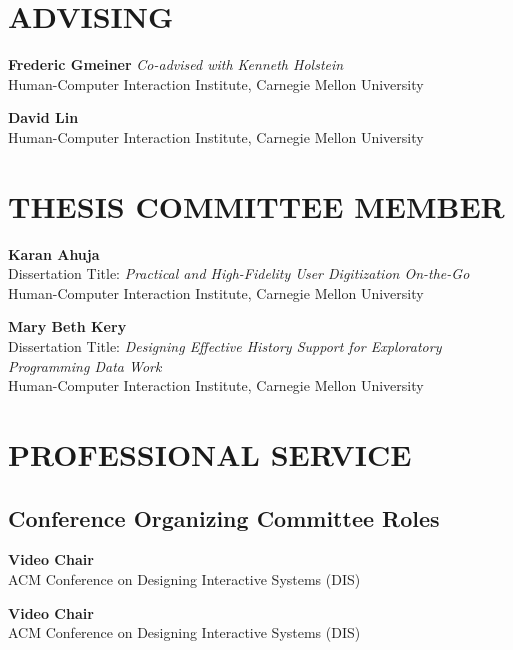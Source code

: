 \documentclass[11pt]{article} %
\begin{document}
\section*{\uppercase{Advising}}
 \textbf{Frederic Gmeiner} \textit{Co-advised with Kenneth Holstein}\\
Human-Computer Interaction Institute, Carnegie Mellon University
\medskip

 \textbf{David Lin}\\
Human-Computer Interaction Institute, Carnegie Mellon University


\section*{\uppercase{Thesis committee member}}

 \textbf{Karan Ahuja}\\
Dissertation Title: \textit{Practical and High-Fidelity User Digitization On-the-Go}\\
Human-Computer Interaction Institute, Carnegie Mellon University
\medskip

 \textbf{Mary Beth Kery}\\
Dissertation Title: \textit{Designing Effective History Support for Exploratory Programming Data Work}\\
Human-Computer Interaction Institute, Carnegie Mellon University


\section*{\uppercase{Professional Service}}
\subsection*{Conference Organizing Committee Roles}
 \textbf{Video Chair}\\
ACM Conference on Designing Interactive Systems (DIS)
\medskip

 \textbf{Video Chair}\\
ACM Conference on Designing Interactive Systems (DIS)
\medskip
\end{document}
